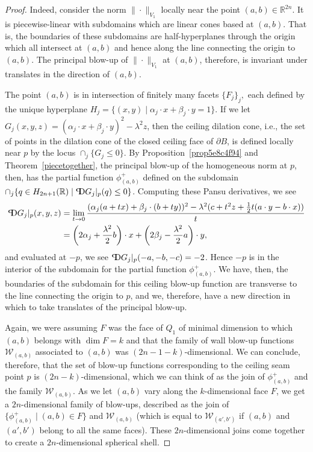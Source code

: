 \documentclass{article}
\theoremstyle{definition}
\newcommand{\norm}[1]{\|#1\|}
\newcommand{\pD}{\text{\scalebox{-1}[1]{$\mathrm{P}$}\!\!$\mathrm{D}$}}
\newcommand{\HHR}{H_{2n+1}(\mathbb{R})}
\newcommand{\R}{{\mathbb R}}
\begin{document}
\begin{proof}
Indeed, consider the norm $\norm{\cdot}_{V_1}$ locally near the point $(a,b) \in \R^{2n}$. It is piecewise-linear with subdomains which are linear cones based at $(a,b)$. That is, the boundaries of these subdomains are half-hyperplanes through the origin which all intersect at $(a,b)$ and hence along the line connecting the origin to $(a,b)$. The principal blow-up of $\norm{\cdot}_{V_1}$ at $(a,b)$, therefore, is invariant under translates in the direction of $(a,b)$.

The point $(a,b)$ is in intersection of finitely many facets $\{F_j\}_j,$ each defined by the unique hyperplane $H_j = \{(x,y)\mid \alpha_j \cdot x + \beta_j\cdot y = 1\}$. If we let $G_j (x,y,z) = (\alpha_j\cdot x + \beta_j\cdot y)^2 - \lambda^2z$, then the ceiling dilation cone, i.e., the set of points in the dilation cone of the closed ceiling face of $\partial B$, is defined locally near $p$ by the locus $ \cap_j\{G_j \leq 0\}$. By Proposition~\ref{prop5e8c4f94} and Theorem~\ref{piecetogether}, the principal blow-up of the homogeneous norm at $p$, then, has the partial function $\phi^+_{(a,b)}$ defined on the subdomain $\cap_j \{q \in \HHR \mid \pD G_j\vert_p(q) \leq 0\}$. Computing these Pansu derivatives, we see
\begin{align*}
\pD G_j\vert_p(x,y,z) &= \lim_{t \to 0} \frac{(\alpha_j (a + tx) + \beta_j\cdot (b + ty))^2 - \lambda^2(c + t^2z + \frac12t (a\cdot y - b\cdot x))}{t}\\
& = \left(2\alpha_j + \frac{\lambda^2}2 b\right)\cdot x + \left(2\beta_j - \frac{\lambda^2}2 a\right) \cdot y,
\end{align*}
and evaluated at $-p$, we see $\pD G_j\vert_p(-a, -b, -c) = -2$. Hence $-p$ is in the interior of the subdomain for the partial function $\phi^+_{(a,b)}$. We have, then, the boundaries of the subdomain for this ceiling blow-up function are transverse to the line connecting the origin to $p$, and we, therefore, have a new direction in which to take translates of the principal blow-up.

Again, we were assuming $F$ was the face of $Q_1$ of minimal dimension to which $(a,b)$ belongs with $\dim F = k$ and that the family of wall blow-up functions $\mathcal W_{(a,b)}$ associated to $(a,b)$ was $(2n-1-k)$-dimensional. We can conclude, therefore, that the set of blow-up functions corresponding to the ceiling seam point $p$ is $(2n-k)$-dimensional, which we can think of as the join of $\phi^+_{(a,b)}$ and the family $\mathcal W_{(a,b)}$. As we let $(a,b)$ vary along the $k$-dimensional face $F$, we get a $2n$-dimensional family of blow-ups, described as the join of $\{\phi^+_{(a,b)} \mid (a,b) \in F\}$ and $\mathcal W_{(a,b)}$ (which is equal to $\mathcal W_{(a',b')}$ if $(a,b)$ and $(a',b')$ belong to all the same faces). These $2n$-dimensional joins come together to create a $2n$-dimensional spherical shell.

\end{proof}
\end{document}

